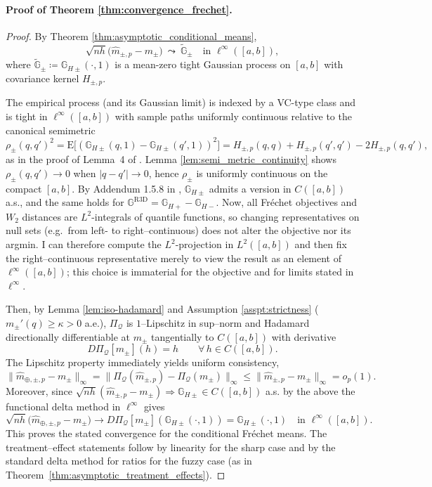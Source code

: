 \documentclass[12pt]{article}
\begin{document}
\paragraph{Proof of Theorem \ref{thm:convergence_frechet}.}
\begin{proof}
By Theorem \ref{thm:asymptotic_conditional_means},
\[
\sqrt{nh}\bigl(\hat m_{\pm,p}-m_\pm\bigr)\ \leadsto\ \widetilde{\mathbb G}_{\pm}
\quad\text{in }\ell^\infty([a,b]),
\]
where $\widetilde{\mathbb G}_{\pm}\coloneqq \mathbb G_{H\pm}(\cdot,1)$ is a mean-zero tight Gaussian process on $[a,b]$ with covariance kernel $H_{\pm,p}$.

The empirical process (and its Gaussian limit) is indexed by a VC-type class and is tight in $\ell^\infty([a,b])$ with sample paths uniformly continuous relative to the canonical semimetric
\[
\rho_\pm(q,q')^2
=\mathrm E\!\big[(\mathbb G_{H\pm}(q,1)-\mathbb G_{H\pm}(q',1))^2\big]
=H_{\pm,p}(q,q)+H_{\pm,p}(q',q')-2H_{\pm,p}(q,q'),
\]
as in the proof of Lemma~4 of \citet{chiang2019robust}. Lemma \ref{lem:semi_metric_continuity} shows $\rho_\pm(q,q')\to0$ when $|q-q'|\to0$, hence $\rho_\pm$ is uniformly continuous on the compact $[a,b]$. By Addendum 1.5.8 in \citet{vaart1996weak}, $\mathbb G_{H\pm}$ admits a version in $C([a,b])$ a.s., and the same holds for $\mathbb G^{\mathrm{R3D}}=\mathbb G_{H+}-\mathbb G_{H-}$.
 Now, all Fr\'echet objectives and $W_2$ distances are $L^2$-integrals of quantile functions, so changing representatives on null sets (e.g.\ from left- to right–continuous) does not alter the objective nor its argmin. I can therefore compute the $L^2$-projection in $L^2([a,b])$ and then fix the right–continuous representative merely to view the result as an element of $\ell^\infty([a,b])$; this choice is immaterial for the objective and for limits stated in $\ell^\infty$.

Then, by Lemma \ref{lem:iso-hadamard} and Assumption \ref{asspt:strictness} ($m_\pm'(q)\ge\kappa>0$ a.e.), $\Pi_{\mathcal{Q}}$ is $1$–Lipschitz in sup–norm and Hadamard directionally differentiable at $m_\pm$ tangentially to $C([a,b])$ with derivative
\[
D \Pi_{\mathcal{Q}}[m_\pm](h)=h\qquad\forall\,h\in C([a,b]).
\]
The Lipschitz property immediately yields uniform consistency,
\[
\|\hat m_{\oplus,\pm,p}-m_\pm\|_\infty
= \|\Pi_{\mathcal{Q}}(\hat m_{\pm,p})-\Pi_{\mathcal{Q}}(m_\pm)\|_\infty
\le \|\hat m_{\pm,p}-m_\pm\|_\infty=o_p(1).
\]
Moreover, since $\sqrt{nh}(\hat m_{\pm,p}-m_\pm)\Rightarrow \mathbb G_{H\pm}\in C([a,b])$ a.s. by the above the functional delta method in $\ell^\infty$ \citep[Thm.~20.8]{van2000asymptotic} gives
\[
\sqrt{nh}\bigl(\hat m_{\oplus,\pm,p}-m_\pm\bigr)
\to  D\Pi_{\mathcal{Q}}[m_\pm](\mathbb G_{H\pm}(\cdot,1)) = \mathbb G_{H\pm}(\cdot,1)
\quad\text{in }\ell^\infty([a,b]).
\]
This proves the stated convergence for the conditional Fr\'echet means. The treatment–effect statements follow by linearity for the sharp case and by the standard delta method for ratios for the fuzzy case (as in Theorem~\ref{thm:asymptotic_treatment_effects}).
\end{proof}
\end{document}
